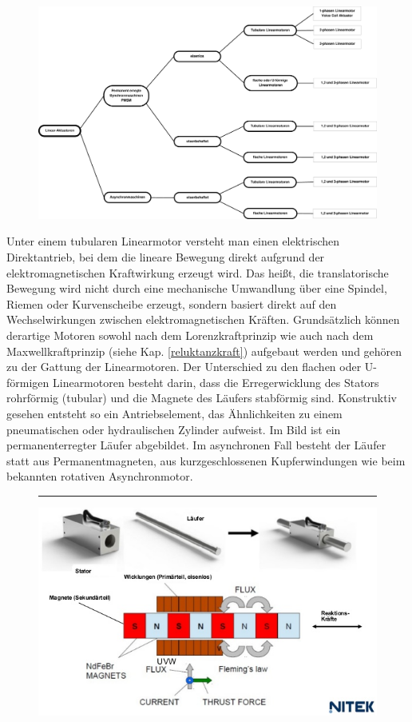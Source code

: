\begin{description}[leftmargin=2.5cm]
					\item[Einteilung]
					\leavevmode \\
					\begin{figure}[h!]
						\centering
						\includegraphics[width=0.9\linewidth]{./pics/el/LinearAktuatoren.eps}
					\end{figure}
				
					\item[Tubulare Linearmotoren] 
					Unter einem tubularen Linearmotor versteht man einen elektrischen Direktantrieb, bei dem die lineare Bewegung direkt aufgrund der elektromagnetischen Kraftwirkung erzeugt wird. Das heißt, die translatorische Bewegung wird nicht durch eine mechanische Umwandlung über eine Spindel, Riemen oder Kurvenscheibe erzeugt, sondern basiert direkt auf den Wechselwirkungen zwischen elektromagnetischen Kräften. Grundsätzlich können derartige Motoren sowohl nach dem Lorenzkraftprinzip wie auch nach dem Maxwellkraftprinzip (siehe Kap. \ref{reluktanzkraft}) aufgebaut werden und gehören zu der Gattung der Linearmotoren. Der Unterschied zu den flachen oder U-förmigen Linearmotoren besteht darin, dass die Erregerwicklung des Stators rohrförmig (tubular) und die Magnete des Läufers stabförmig sind. Konstruktiv gesehen entsteht so ein Antriebselement, das Ähnlichkeiten zu einem pneumatischen oder hydraulischen Zylinder aufweist. Im Bild ist ein permanenterregter Läufer abgebildet. Im asynchronen Fall besteht der Läufer statt aus Permanentmagneten, aus kurzgeschlossenen Kupferwindungen wie beim bekannten rotativen Asynchronmotor.
					\begin{figure}[!h]
						\centering \rule{1.5cm}{0cm}
						\includegraphics[width=0.55\linewidth]{./pics/el/tubular}
					\end{figure}
					

\end{description}
